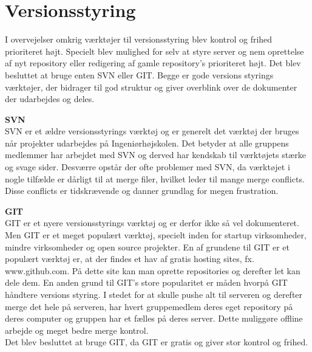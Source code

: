 \section{Versionsstyring}
I overvejelser omkrig værktøjer til versionsstyring blev kontrol og frihed prioriteret højt. Specielt blev mulighed for selv at styre server og nem oprettelse af nyt repository eller redigering af gamle repository's prioriteret højt.
Det blev besluttet at bruge enten SVN eller GIT. Begge er gode versions styrings værktøjer, der bidrager til god struktur og giver overblink over de dokumenter der udarbejdes og deles. 


\textbf{SVN} \\
SVN er et ældre versionsstyrings værktøj og er generelt det værktøj der bruges når projekter udarbejdes på Ingeniørhøjskolen. Det betyder at alle gruppens medlemmer har arbejdet med SVN og derved har kendskab til værktøjets stærke og svage sider. 
Desværre opstår der ofte problemer med SVN, da værktøjet i nogle tilfælde er dårligt til at merge filer, hvilket leder til mange merge conflicts. Disse conflicts er tidskrævende og danner grundlag for megen frustration. 

\textbf{GIT} \\
GIT er et nyere versionsstyrings værktøj og er derfor ikke så vel dokumenteret.
Men GIT er et meget populært værktøj, specielt inden for startup virksomheder, mindre virksomheder og open source projekter. 
En af grundene til GIT er et populært værktøj er, at der findes et hav af gratis hosting sites, fx. www.github.com. På dette site kan man oprette repositories og derefter let kan dele dem. 
En anden grund til GIT's store popularitet er måden hvorpå GIT håndtere versions styring. I stedet for at skulle pushe alt til serveren og derefter merge det hele på serveren, har hvert gruppemedlem deres eget repository på deres computer og gruppen har et fælles på deres server. Dette muliggøre offline arbejde og meget bedre merge kontrol. \\

Det blev besluttet at bruge GIT, da GIT er gratis og giver stor kontrol og frihed.